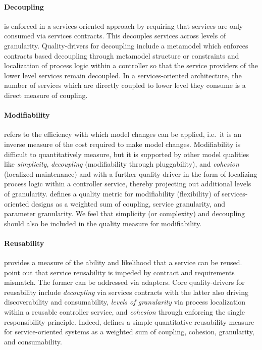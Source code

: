\paragraph{Decoupling} is enforced in a services-oriented approach by requiring that services are only consumed via services contracts. This decouples services across levels of granularity. Quality-drivers for decoupling include a metamodel which enforces contracts based decoupling through metamodel structure or constraints and localization of process logic within a controller so that the service providers of the lower level services remain decoupled. In a services-oriented architecture, the number of services which are directly coupled to lower level they consume is a direct measure of coupling\cite{shim_design_2008}.

\paragraph{Modifiability} refers to the efficiency with which model changes can be applied, i.e.\ it is an inverse measure of the cost required to make model changes. Modifiability is difficult to quantitatively measure, but it is supported by other model qualities like \emph{simplicity},  \emph{decoupling} (modifiability through pluggability), and \emph{cohesion} (localized maintenance) and with a further quality driver in the form of localizing process logic within a controller service, thereby projecting out additional levels of granularity. \cite{shim_design_2008} defines a quality metric for modifiability (flexibility) of services-oriented designs as a weighted sum of coupling, service granularity, and parameter granularity. We feel that simplicity (or complexity) and decoupling should also be included in the quality measure for modifiability.

\paragraph{Reusability} provides a measure of the ability and likelihood that a service can be reused.  \cite{khoshkbarforoushha_metric_2010,choi_quality_2008,feuerlicht_determinants_2007}
\cite{khoshkbarforoushha_metric_2010} point out that service reusability is impeded by contract and requirements mismatch. The former can be addressed via adapters. Core quality-drivers for reusability include \emph{decoupling} via services contracts with the latter also driving discoverability and consumability, \emph{levels of granularity} via process localization within a reusable controller service, and \emph{cohesion} through enforcing the single responsibility principle. Indeed, \cite{shim_design_2008} defines a simple quantitative reusability measure for service-oriented systems as a weighted sum of coupling, cohesion, granularity, and consumability.

